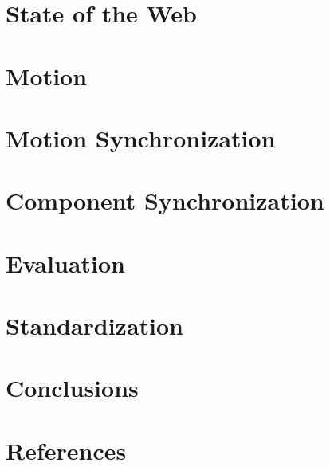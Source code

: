 \documentclass[graybox]{svmult}
\begin{document}
\section{State of the Web}
\label{sec:web}


\section{Motion}
\label{sec:motion}


\section{Motion Synchronization}
\label{sec:motionsync}


\section{Component Synchronization}
\label{sec:compsync}


\section{Evaluation}
\label{sec:eval}


\section{Standardization}
\label{sec:standard}


\section{Conclusions}
\label{sec:concl}


\section*{References}

 
\end{document}
